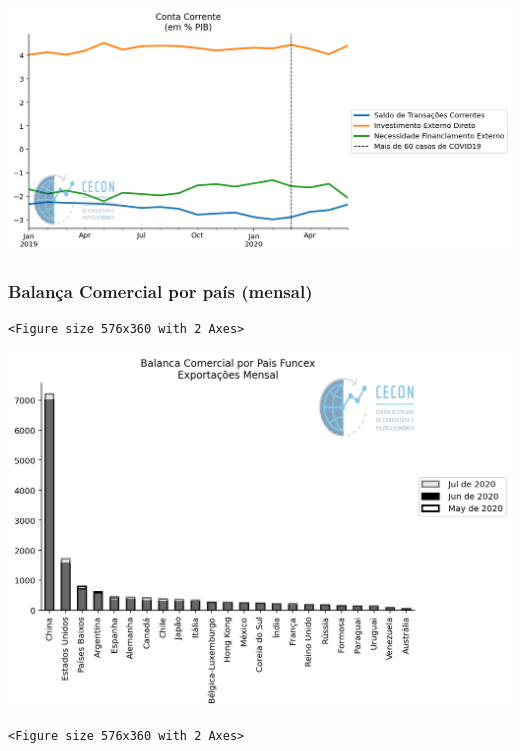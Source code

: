 \documentclass[11pt]{article}
\begin{document}
\begin{center}
\includegraphics[width=.9\linewidth]{obipy-resources/62e383af79e91b63c7fc98dd7fb55b3c3ececcb9/f6c8f5fbe4472c0801241dc39870a218a6e8cb6d.png}
\end{center}

\subsubsection{Balança Comercial por país (mensal)}
\label{sec:orgf8e5991}

\begin{verbatim}
<Figure size 576x360 with 2 Axes>
\end{verbatim}


\begin{center}
\includegraphics[width=.9\linewidth]{obipy-resources/62e383af79e91b63c7fc98dd7fb55b3c3ececcb9/c3ff075133f390045c0fb620ae17d0d8ae93f0b8.png}
\end{center}


\begin{verbatim}
<Figure size 576x360 with 2 Axes>
\end{verbatim}
\end{document}

